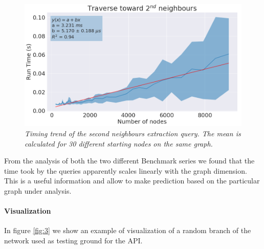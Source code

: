 \documentclass[11pt,twocolumn]{article}
\begin{document}
\begin{figure}[ht!]
   \includegraphics[width=\linewidth]{images/traverse_0_2_readable.png}
   \caption{\small{\textit{Timing trend of the second neighbours extraction query. The mean is calculated for 30 different starting nodes on the same graph.}}}
   \label{fig:tr_0_2}
\end{figure}

From the analysis of both the two different Benchmark series we found that the time took by the queries apparently scales linearly with the graph dimension.
This is a useful information and allow to make prediction based on the particular graph under analysis.

\paragraph{Visualization}
In figure \ref{fig:3} we show an example of visualization of a random branch of the network used as testing ground for the API.
\end{document}
